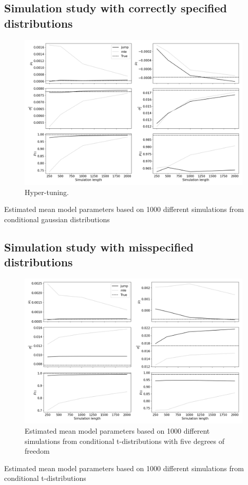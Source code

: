 \subsection{Simulation study with correctly specified distributions}

\begin{figure}[H] 
    \centering
    \includegraphics[width=1\textwidth]{analysis/model_convergence/images/simulation_normal.png}
    \caption{Hyper-tuning.}
\end{figure}

\begin{table}[H]
\centering
\caption{Estimated mean model parameters based on 1000 different simulations from conditional gaussian distributions}

\end{table}

 
\subsection{Simulation study with misspecified distributions}

\begin{figure}[H] 
    \centering
    \includegraphics[width=1\textwidth]{analysis/model_convergence/images/simulation_t.png}
    \caption{Estimated mean model parameters based on 1000 different simulations from conditional t-distributions with five degrees of freedom}
\end{figure}

\begin{table}[H]
\centering
\caption{Estimated mean model parameters based on 1000 different simulations from conditional t-distributions}

\end{table}